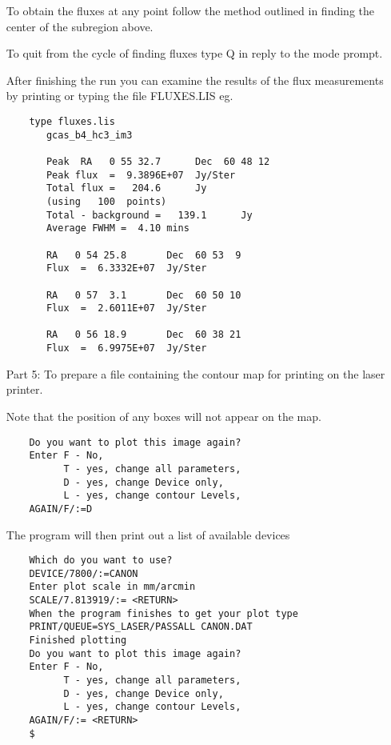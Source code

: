 \begin{itemize}
To obtain the fluxes at any point follow the method outlined in finding the
center of the subregion above.

To quit from the cycle of finding fluxes type Q in reply to the mode prompt.

After finishing the run you can examine the results of the flux measurements
by printing or typing the file FLUXES.LIS eg.

\begin{verbatim}
    type fluxes.lis
       gcas_b4_hc3_im3

       Peak  RA   0 55 32.7      Dec  60 48 12
       Peak flux  =  9.3896E+07  Jy/Ster
       Total flux =   204.6      Jy
       (using   100  points)
       Total - background =   139.1      Jy
       Average FWHM =  4.10 mins

       RA   0 54 25.8       Dec  60 53  9
       Flux  =  6.3332E+07  Jy/Ster

       RA   0 57  3.1       Dec  60 50 10
       Flux  =  2.6011E+07  Jy/Ster

       RA   0 56 18.9       Dec  60 38 21
       Flux  =  6.9975E+07  Jy/Ster
\end{verbatim}

\pagebreak
\item [Part 5:] To prepare a file containing the contour map for printing on the
laser printer.

Note that the position of any boxes will not appear on the map.

\begin{verbatim}
    Do you want to plot this image again?
    Enter F - No,
          T - yes, change all parameters,
          D - yes, change Device only,
          L - yes, change contour Levels,
    AGAIN/F/:=D
\end{verbatim}

The program will then print out a list of available devices

\begin{verbatim}
    Which do you want to use?
    DEVICE/7800/:=CANON
    Enter plot scale in mm/arcmin
    SCALE/7.813919/:= <RETURN>
    When the program finishes to get your plot type
    PRINT/QUEUE=SYS_LASER/PASSALL CANON.DAT
    Finished plotting
    Do you want to plot this image again?
    Enter F - No,
          T - yes, change all parameters,
          D - yes, change Device only,
          L - yes, change contour Levels,
    AGAIN/F/:= <RETURN>
    $
\end{verbatim}


\end{itemize}

